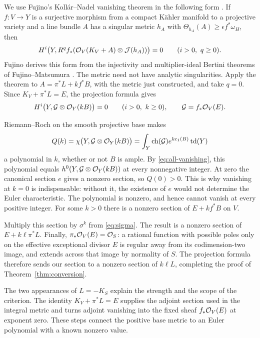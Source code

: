 We use Fujino's Koll\'ar--Nadel vanishing theorem in the following
form \cite[Theorem~1.3]{Fujino2018}. If \(f:V\to Y\) is a
surjective morphism from a compact K\"ahler manifold to a projective
variety and a line bundle \(A\) has a singular metric \(h_A\) with
\(\Theta_{h_A}(A)\ge\epsilon f^*\omega_H\), then
\[
H^i\bigl(Y,R^qf_*(\mathcal O_V(K_V+A)\otimes\mathcal J(h_A))\bigr)=0
\qquad (i>0,\ q\ge0).
\]
Fujino derives this form from the injectivity and multiplier-ideal
Bertini theorems of Fujino--Matsumura
\cite[Theorems~1.1--1.3]{Fujino2018}. The metric need not have analytic
singularities. Apply the theorem to
\(A=\pi^*L+kf^*B\), with the metric just constructed, and take \(q=0\). Since
\(K_V+\pi^*L=E\), the projection formula gives
\begin{equation}\label{eq:all-vanishing}
H^i\bigl(Y,\mathcal G\otimes\mathcal O_Y(kB)\bigr)=0
\qquad(i>0,\ k\ge0),
\qquad \mathcal G=f_*\mathcal O_V(E).
\end{equation}

Riemann--Roch on the smooth projective base makes
\[
Q(k)=\chi\bigl(Y,\mathcal G\otimes\mathcal O_Y(kB)\bigr)
=\int_Y\operatorname{ch}(\mathcal G)e^{k c_1(B)}\operatorname{td}(Y)
\]
a polynomial in \(k\), whether or not \(B\) is ample. By
\eqref{eq:all-vanishing}, this polynomial equals
\(h^0(Y,\mathcal G\otimes\mathcal O_Y(kB))\) at every nonnegative integer.
At zero the canonical section \(e\) gives a nonzero section, so
\(Q(0)>0\). This is why vanishing at \(k=0\) is indispensable:
without it, the existence of \(e\) would not determine the Euler
characteristic. The polynomial is nonzero, and hence cannot vanish
at every positive integer. For some \(k>0\) there is a nonzero
section of \(E+kf^*B\) on \(V\).

Multiply this section by \(\sigma^k\) from \eqref{eq:sigma}. The
result is a nonzero section of \(E+k\ell\pi^*L\). Finally,
\(\pi_*\mathcal O_V(E)=\mathcal O_S\): a rational function with possible poles
only on the effective exceptional divisor \(E\) is regular away
from its codimension-two image, and extends across that image by
normality of \(S\). The projection formula therefore sends our
section to a nonzero section of \(k\ell L\), completing the proof
of Theorem~\ref{thm:conversion}.

The two appearances of \(L=-K_S\) explain the strength and the scope
of the criterion. The identity \(K_V+\pi^*L=E\) supplies the
adjoint section used in the integral metric and turns adjoint
vanishing into the fixed sheaf \(f_*\mathcal O_V(E)\) at exponent zero.
These steps connect the positive base metric to an Euler polynomial
with a known nonzero value.
